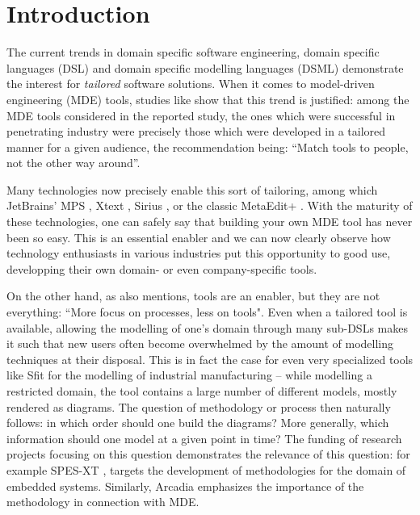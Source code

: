 \section{Introduction}
\label{sec:intro}
\vspace{-.3cm}
The current trends in domain specific software engineering, domain specific
languages (DSL) and domain specific modelling languages (DSML) demonstrate the
interest for \emph{tailored} software solutions.
When it comes to model-driven engineering (MDE) tools, studies like \cite{DBLP:conf/models/WhittleHRBH13} 
show that this trend is justified: among the MDE tools considered
in the reported study, the ones which were successful in penetrating industry
were precisely those which were developed in a tailored manner for a given
audience, the recommendation being: ``Match tools to people, not the other way
around''.

Many technologies now precisely enable this sort of tailoring, among which 
JetBrains' MPS \cite{DBLP:conf/pppj/PechSV13},
Xtext \cite{DBLP:conf/oopsla/EysholdtB10},
Sirius \cite{DBLP:conf/asplos/HauswaldLZLRKDM15}, or the classic MetaEdit+ \cite{DBLP:conf/sle/Tolvanen16}.
With the maturity of these technologies, one can safely say that building your own MDE tool
has never been so easy.
This is an essential enabler and we can now clearly observe how technology
enthusiasts in various industries put this opportunity to good use, developping their own domain- or even company-specific tools.

On the other hand, as \cite{DBLP:conf/models/WhittleHRBH13} also mentions, tools
are an enabler, but they are not everything: ``More focus on processes, less on
tools".
Even when a tailored tool is available, allowing the modelling of one's domain
through many sub-DSLs makes it such that new users often become overwhelmed by
the amount of modelling techniques at their disposal. This is in fact the case
for even very specialized tools like Sfit \cite{DBLP:conf/vamos/BayhaLAMI16} for
the modelling of industrial manufacturing -- while modelling a restricted
domain, the tool contains a large number of different models, mostly rendered as
diagrams. The question of methodology or process then naturally follows: in
which order should one build the diagrams? More generally, which information
should one model at a given point in time? The funding of research projects
focusing on this question demonstrates the relevance of this question: for
example SPES-XT \cite{DBLP:books/sp/spes2016}, targets the development of
methodologies for the domain of embedded systems.
Similarly, Arcadia \cite{DBLP:conf/syscon/BonnetVEN16} emphasizes the importance
of the methodology in connection with MDE.

